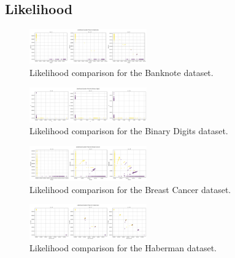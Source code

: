 \documentclass[conference]{IEEEtran}
\begin{document}
\subsection{Likelihood}

\begin{figure}[H]
    \centering
    \includegraphics[width=0.45\textwidth]{../scripts/comparison_results/Banknote_likelihood.png}
    \caption{Likelihood comparison for the Banknote dataset.}
    \label{fig:banknote_likelihood}
\end{figure}

\begin{figure}[H]
    \centering
    \includegraphics[width=0.45\textwidth]{../scripts/comparison_results/Binary Digits_likelihood.png}
    \caption{Likelihood comparison for the Binary Digits dataset.}
    \label{fig:binary_digits_likelihood}
\end{figure}

\begin{figure}[H]
    \centering
    \includegraphics[width=0.45\textwidth]{../scripts/comparison_results/Breast Cancer_likelihood.png}
    \caption{Likelihood comparison for the Breast Cancer dataset.}
    \label{fig:breast_cancer_likelihood}
\end{figure}

\begin{figure}[H]
    \centering
    \includegraphics[width=0.45\textwidth]{../scripts/comparison_results/Haberman_likelihood.png}
    \caption{Likelihood comparison for the Haberman dataset.}
    \label{fig:haberman_likelihood}
\end{figure}
\end{document}
